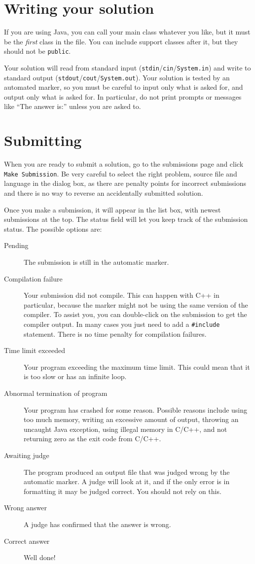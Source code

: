 \documentclass[a4paper]{article}
\begin{document}
\section{Writing your solution}
If you are using Java, you can call your main class whatever you
like, but it must be the \emph{first} class in the file. You can
include support classes after it, but they should not be
\texttt{public}.

Your solution will read from standard input
(\texttt{stdin}/\texttt{cin}/\texttt{System.in}) and write to standard
output (\texttt{stdout}/\texttt{cout}/\texttt{System.out}). Your
solution is tested by an automated marker, so you must be careful to
input only what is asked for, and output only what is asked for. In
particular, do not print prompts or messages like ``The answer is:''
unless you are asked to.

\section{Submitting}
When you are ready to submit a solution, go to the submissions page and
click \texttt{Make Submission}. Be very careful to select the right
problem, source file and language in the dialog box, as there are
penalty points for incorrect submissions and there is no way to reverse
an accidentally submitted solution.

Once you make a submission, it will appear in the list box, with newest
submissions at the top. The status field will let you keep track of the
submission status. The possible options are:
\begin{description}
\item[Pending] The submission is still in the automatic marker.
\item[Compilation failure] Your submission did not compile. This can
happen with C++ in particular, because the marker might not
be using the same version of the compiler. To assist you, you can
double-click on the submission to get the compiler output. In many
cases you just need to add a \verb"#include" statement. There is no
time penalty for compilation failures.
\item[Time limit exceeded] Your program exceeding the maximum time
limit. This could mean that it is too slow or has an infinite loop.
\item[Abnormal termination of program] Your program has crashed for
some reason. Possible reasons include using too much memory, writing an
excessive amount of output, throwing an uncaught Java exception, using
illegal memory in C/C++, and not returning zero as the exit code from
C/C++.
\item[Awaiting judge] The program produced an output file that was
judged wrong by the automatic marker. A judge will look at it, and
if the only error is in formatting it may be judged correct. You should
not rely on this.
\item[Wrong answer] A judge has confirmed that the answer is wrong.
\item[Correct answer] Well done!
\end{description}
\end{document}
